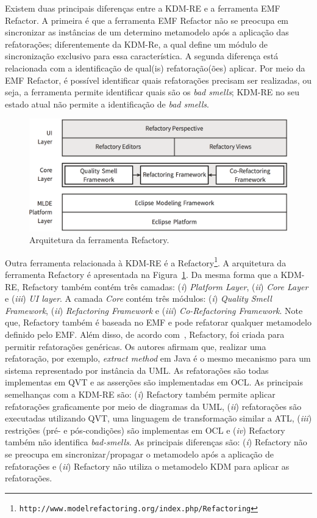 Existem duas principais diferenças entre a KDM-RE e a ferramenta EMF Refactor. A primeira é que a ferramenta EMF Refactor não se preocupa em sincronizar as instâncias de um determino metamodelo após a aplicação das refatorações; diferentemente da KDM-Re, a qual define um módulo de sincronização exclusivo para essa característica. A segunda diferença está relacionada com a identificação de qual(is) refatoração(ões) aplicar. Por meio da EMF Refactor, é possível identificar quais refatorações precisam ser realizadas, ou seja, a ferramenta permite identificar quais são os \textit{bad smells}; KDM-RE no seu estado atual não permite a identificação de \textit{bad smells}.


\begin{figure}[h]
	\centering
	\caption{Arquitetura da ferramenta Refactory.}
	\label{fig:refactory}
	\includegraphics[scale=0.2]{images/refactoryArchitecture}
\end{figure}

Outra ferramenta relacionada à KDM-RE é a Refactory\footnote{\texttt{http://www.modelrefactoring.org/index.php/Refactoring}}. A arquitetura da ferramenta Refactory é apresentada na Figura~\ref{fig:refactory}. Da mesma forma que a KDM-RE, Refactory também contém três camadas: (\textit{i}) \textit{Platform Layer}, (\textit{ii}) \textit{Core Layer} e (\textit{iii}) \textit{UI layer}. A camada \textit{Core} contém três módulos: (\textit{i}) \textit{Quality Smell Framework}, (\textit{ii}) \textit{Refactoring Framework} e (\textit{iii}) \textit{Co-Refactoring Framework}. Note que, Refactory também é baseada no EMF e pode refatorar qualquer metamodelo definido pelo EMF. Além disso, de acordo com~, Refactory, foi criada para permitir refatorações genéricas. Os autores afirmam que, realizar uma refatoração, por exemplo, \textit{extract method} em Java é o mesmo mecanismo para um sistema representado por instância da UML. As refatorações são todas implementas em QVT e as asserções são implementadas em OCL. As principais semelhanças com a KDM-RE são: (\textit{i}) Refactory também permite aplicar refatorações graficamente por meio de diagramas da UML, (\textit{ii}) refatorações são executadas utilizando QVT, uma linguagem de transformação similar a ATL, (\textit{iii}) restrições (pré- e pós-condições) são implementas em OCL e (\textit{iv}) Refactory também não identifica \textit{bad-smells}. As principais diferenças são: (\textit{i}) Refactory não se preocupa em sincronizar/propagar o metamodelo após a aplicação de refatorações e (\textit{ii}) Refactory não utiliza o metamodelo KDM para aplicar as refatorações.



